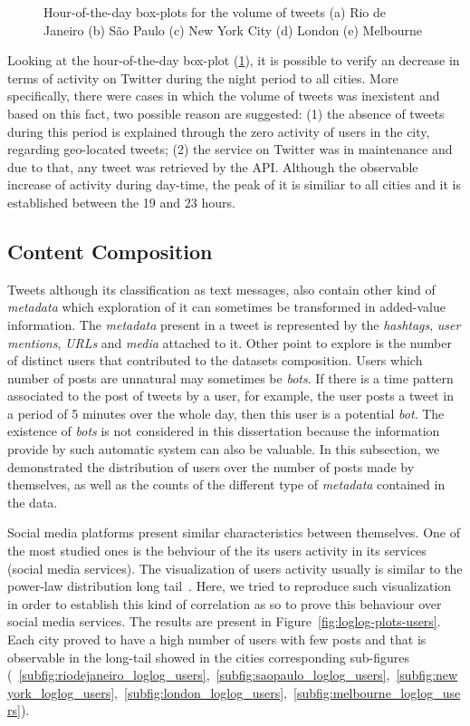 \begin{figure}[htbp]
	\caption[Hour-of-the-day box-plots for the volume of tweets]{Hour-of-the-day box-plots for the volume of tweets (a) Rio de Janeiro (b) São Paulo (c) New York City (d) London (e) Melbourne}
	\label{fig:box_plots_hour_of_day}
\end{figure}

Looking at the hour-of-the-day box-plot (\ref{fig:box_plots_hour_of_day}), it is possible to verify an decrease in terms of activity on Twitter during the night period to all cities. More specifically, there were cases in which the volume of tweets was inexistent and based on this fact, two possible reason are suggested: (1) the absence of tweets during this period is explained through the zero activity of users in the city, regarding geo-located tweets; (2) the service on Twitter was in maintenance and due to that, any tweet was retrieved by the API. Although the observable increase of activity during day-time, the peak of it is similiar to all cities and it is established between the 19 and 23 hours.

\subsection{Content Composition}

Tweets although its classification as text messages, also contain other kind of \textit{metadata} which exploration of it can sometimes be transformed in added-value information. The \textit{metadata} present in a tweet is represented by the \textit{hashtags}, \textit{user mentions}, \textit{URLs} and \textit{media} attached to it. Other point to explore is the number of distinct users that contributed to the datasets composition. Users which number of posts are unnatural may sometimes be \textit{bots}. If there is a time pattern associated to the post of tweets by a user, for example, the user posts a tweet in a period of 5 minutes over the whole day, then this user is a potential \textit{bot}. The existence of \textit{bots} is not considered in this dissertation because the information provide by such automatic system can also be valuable. In this subsection, we demonstrated the distribution of users over the number of posts made by themselves, as well as the counts of the different type of \textit{metadata }contained in the data. 

Social media platforms present similar characteristics between themselves. One of the most studied ones is the behviour of the its users activity in its services (social media services). The visualization of users activity usually is similar to the power-law distribution long tail~\cite{muchnik2013origins}. Here, we tried to reproduce such visualization in order to establish this kind of correlation as so to prove this behaviour over social media services. The results are present in Figure~\ref{fig:loglog-plots-users}. Each city proved to have a high number of users with few posts and that is observable in the long-tail showed in the cities corresponding sub-figures (~\ref{subfig:riodejaneiro_loglog_users},~\ref{subfig:saopaulo_loglog_users},~\ref{subfig:newyork_loglog_users},~\ref{subfig:london_loglog_users},~\ref{subfig:melbourne_loglog_users}).

